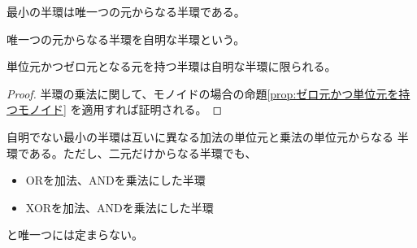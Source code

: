 	最小の半環は唯一つの元からなる半環である。

	\begin{definition}[自明な半環]\label{def:自明な半環} %
		唯一つの元からなる半環を自明な半環という。
	\end{definition} %

	\begin{proposition}[ゼロ元かつ単位元を持つ半環]\label{prop:ゼロ元かつ単位元を持つ半環} %
		単位元かつゼロ元となる元を持つ半環は自明な半環に限られる。
	\end{proposition} %
	\begin{proof} %
		半環の乗法に関して、モノイドの場合の命題\ref{prop:ゼロ元かつ単位元を持つモノイド}
		を適用すれば証明される。
	\end{proof} %

	自明でない最小の半環は互いに異なる加法の単位元と乗法の単位元からなる
	半環である。ただし、二元だけからなる半環でも、
	\begin{itemize}
		\item ORを加法、ANDを乗法にした半環
		\item XORを加法、ANDを乗法にした半環
	\end{itemize}
	と唯一つには定まらない。

